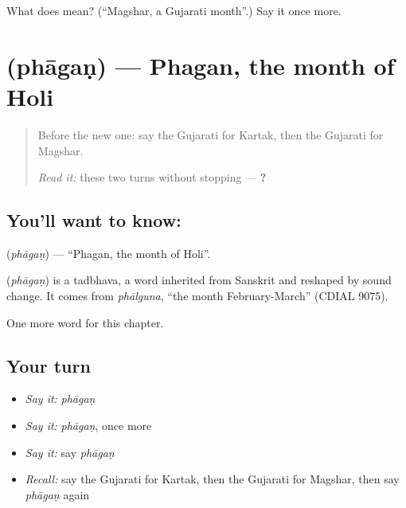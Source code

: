 \begin{tcolorbox}[breakable,colback=teal!4,colframe=teal!35!black,title={Before you move on}]
What does  mean? (\textquotedblleft{}Magshar, a Gujarati month\textquotedblright{}.) Say it once more.
\end{tcolorbox}
\section[\texorpdfstring{\gu{ફાગણ} (phāgaṇ)}{ફાગણ (phāgaṇ)}]{ (phāgaṇ) — Phagan, the month of Holi}

\label{lesson:GU-C97-phagan}



\begin{quote}
Before the new one: say the Gujarati for Kartak, then the Gujarati for Magshar.

\emph{Read it:} these two turns without stopping — \textbf{  ?   }
\end{quote}

\subsection*{You'll want to know: }
\textbf{} (\emph{phāgaṇ}) — \textquotedblleft{}Phagan, the month of Holi\textquotedblright{}.

\begin{cousinweb}
\textbf{} (\emph{phāgaṇ}) is a tadbhava, a word inherited from Sanskrit and reshaped by sound change. It comes from \emph{phālguna}, \textquotedblleft{}the month February-March\textquotedblright{} (CDIAL 9075).
\end{cousinweb}

\begin{grammarlens}[title={What you've built}]
One more word for this chapter.
\end{grammarlens}

\subsection*{Your turn}
\begin{itemize}
\raggedright
  \item \emph{Say it:} \emph{phāgaṇ}
  \item \emph{Say it:} \emph{phāgaṇ}, once more
  \item \emph{Say it:} say \emph{phāgaṇ}
  \item \emph{Recall:} say the Gujarati for Kartak, then the Gujarati for Magshar, then say \emph{phāgaṇ} again
\end{itemize}

